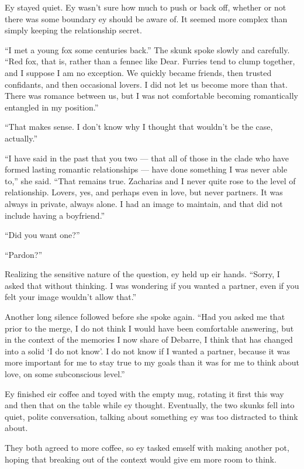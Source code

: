 Ey stayed quiet. Ey wasn't sure how much to push or back off, whether or not there was some boundary ey should be aware of. It seemed more complex than simply keeping the relationship secret.

``I met a young fox some centuries back.'' The skunk spoke slowly and carefully. ``Red fox, that is, rather than a fennec like Dear. Furries tend to clump together, and I suppose I am no exception. We quickly became friends, then trusted confidants, and then occasional lovers. I did not let us become more than that. There was romance between us, but I was not comfortable becoming romantically entangled in my position.''

``That makes sense. I don't know why I thought that wouldn't be the case, actually.''

``I have said in the past that you two — that all of those in the clade who have formed lasting romantic relationships — have done something I was never able to,'' she said. ``That remains true. Zacharias and I never quite rose to the level of relationship. Lovers, yes, and perhaps even in love, but never partners. It was always in private, always alone. I had an image to maintain, and that did not include having a boyfriend.''

``Did you want one?''

``Pardon?''

Realizing the sensitive nature of the question, ey held up eir hands. ``Sorry, I asked that without thinking. I was wondering if you wanted a partner, even if you felt your image wouldn't allow that.''

Another long silence followed before she spoke again. ``Had you asked me that prior to the merge, I do not think I would have been comfortable answering, but in the context of the memories I now share of Debarre, I think that has changed into a solid `I do not know'. I do not know if I wanted a partner, because it was more important for me to stay true to my goals than it was for me to think about love, on some subconscious level.''

Ey finished eir coffee and toyed with the empty mug, rotating it first this way and then that on the table while ey thought. Eventually, the two skunks fell into quiet, polite conversation, talking about something ey was too distracted to think about.

They both agreed to more coffee, so ey tasked emself with making another pot, hoping that breaking out of the context would give em more room to think.

